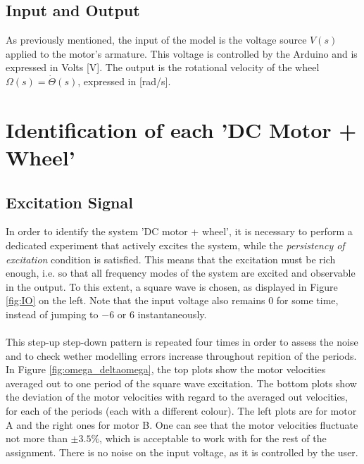 \documentclass[a4paper,kul]{kulakarticle} %
\begin{document}

\subsection{Input and Output}
As previously mentioned, the input of the model is the voltage source $V(s)$ applied to the motor's armature. This voltage is controlled by the Arduino and is expressed in Volts [V]. The output is the rotational velocity of the wheel  $\Omega(s) = \dot{\Theta}(s)$, expressed in [rad/s].


\section{Identification of each 'DC Motor + Wheel'}
\subsection{Excitation Signal}
In order to identify the system 'DC motor + wheel', it is necessary to perform a dedicated experiment that actively excites the system, while the \textit{persistency of excitation} condition is satisfied. This means that the excitation must be rich enough, i.e. so that all frequency modes of the system are excited and observable in the output. To this extent, a square wave is chosen, as displayed in Figure \ref{fig:IO} on the left. Note that the input voltage also remains $0$ for some time, instead of jumping to $-6$ or $6$ instantaneously. 
\\\\
This step-up step-down pattern is repeated four times in order to assess the noise and to check wether modelling errors increase throughout repition of the periods. In Figure \ref{fig:omega_deltaomega}, the top plots show the motor velocities averaged out to one period of the square wave excitation. The bottom plots show the deviation of the motor velocities with regard to the averaged out velocities, for each of the periods (each with a different colour). The left plots are for motor A and the right ones for motor B. One can see that the motor velocities fluctuate not more than $\pm 3.5\%$, which is acceptable to work with for the rest of the assignment. There is no noise on the input voltage, as it is controlled by the user.
\end{document}
